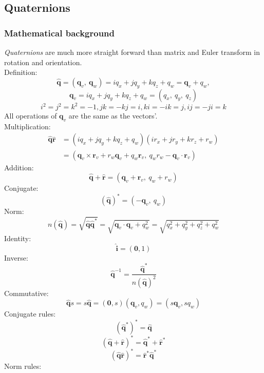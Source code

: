 \documentclass[10pt, a4paper]{article}
\begin{document}
        \subsection{Quaternions}
            \subsubsection{Mathematical background}
            \emph{Quaternions} are much more straight forward than matrix and Euler transform in rotation and orientation.\\    
            Definition:\\
            $$\hat{\textbf{q}} = (\textbf{q}_v,\ \textbf{q}_w) = iq_x + jq_y + kq_z + q_w = \textbf{q}_v + q_w,$$
            $$\textbf{q}_v = iq_x + jq_y + kq_z + q_w = (q_x,\ q_y,\ q_z)$$
            $$i^2 = j^2 = k^2 = -1, jk = -kj = i, ki = -ik = j, ij = -ji = k$$
            \indent All operations of $\textbf{q}_v$ are the same as the vectors'.\\
            \indent Multiplication: 
            \begin{align*}
                \hat{\textbf{q}}\hat{\textbf{r}} &= (iq_x + jq_y + kq_z + q_w)(ir_x + jr_y + kr_z + r_w)\\
                    &= (\textbf{q}_v\times\textbf{r}_v + r_w\textbf{q}_v + q_w\textbf{r}_v,\ q_wr_w - \textbf{q}_v\cdot  \textbf{r}_v)
            \end{align*}
            \indent Addition:
                $$\hat{\textbf{q}} + \hat{\textbf{r}} = (\textbf{q}_v + \textbf{r}_v,\ q_w + r_w)$$
            \indent Conjugate:
                $$(\hat{\textbf{q}})^* = (-\textbf{q}_v,\ q_w)$$
            \indent Norm: 
                $$n(\hat{\textbf{q}}) = \sqrt{\hat{\textbf{q}}\hat{\textbf{q}}^*} =  \sqrt{\textbf{q}_v\cdot\textbf{q}_v + q_w^2} = \sqrt{q_x^2 + q_y^2 + q_z^2 + q_w^2}$$ 
            \indent Identity:
                $$\hat{\textbf{i}} = (\textbf{0}, 1)$$
            \indent Inverse: 
                $$\hat{\textbf{q}}^{-1} = \frac{\hat{\textbf{q}}^*}{n(\hat{\textbf{q}})^2}$$ 
                \indent Commutative: 
                $$\hat{\textbf{q}}s = s\hat{\textbf{q}} = (\textbf{0}, s)(\textbf{q}_v, q_w) = (s\textbf{q}_v, sq_w)$$
            \indent Conjugate rules: 
                $$(\hat{\textbf{q}}^*)^* = \hat{\textbf{q}}$$
                $$(\hat{\textbf{q}} + \hat{\textbf{r}})^* = \hat{\textbf{q}}^* + \hat{\textbf{r}}^*$$
                $$(\hat{\textbf{q}}\hat{\textbf{r}})^* = \hat{\textbf{r}}^*\hat{\textbf{q}}^*$$
            \indent Norm rules: 
\end{document}
